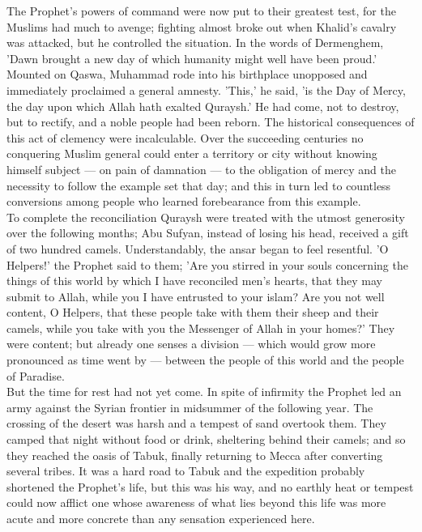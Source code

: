 \documentclass[11pt, b5paper, twoside]{book}
\begin{document}
The Prophet's powers of command were now put to their greatest test, for the Muslims had much to 
avenge; fighting almost broke out when Khalid's cavalry was attacked, but he controlled the 
situation. In the words of Dermenghem, 'Dawn brought a new day of which humanity might well have been 
proud.' Mounted on Qaswa, Muhammad rode into his birthplace unopposed and immediately proclaimed a 
general amnesty. 'This,' he said, 'is the Day of Mercy, the day upon which Allah hath exalted 
Quraysh.' He had come, not to destroy, but to rectify, and a noble people had been reborn. The 
historical consequences of this act of clemency were incalculable. Over the succeeding centuries no 
conquering Muslim general could enter a territory or city without knowing himself subject --- on pain 
of damnation --- to the obligation of mercy and the necessity to follow the example set that day; and 
this in turn led to countless conversions among people who learned forebearance from this example. \\

To complete the reconciliation Quraysh were treated with the utmost generosity over the following 
months; Abu Sufyan, instead of losing his head, received a gift of two hundred camels. 
Understandably, the ansar began to feel resentful. 'O Helpers!' the Prophet said to them; 'Are you 
stirred in your souls concerning the things of this world by which I have reconciled men's hearts, 
that they may submit to Allah, while you I have entrusted to your islam? Are you not well content, O 
Helpers, that these people take with them their sheep and their camels, while you take with you the 
Messenger of Allah in your homes?' They were content; but already one senses a division --- which would 
grow more pronounced as time went by --- between the people of this world and the people of Paradise. \\

But the time for rest had not yet come. In spite of infirmity the Prophet led an army against the 
Syrian frontier in midsummer of the following year. The crossing of the desert was harsh and a 
tempest of sand overtook them. They camped that night without food or drink, sheltering behind their 
camels; and so they reached the oasis of Tabuk, finally returning to Mecca after converting several 
tribes. It was a hard road to Tabuk and the expedition probably shortened the Prophet's life, but 
this was his way, and no earthly heat or tempest could now afflict one whose awareness of what lies 
beyond this life was more acute and more concrete than any sensation experienced here. \\
\end{document}
